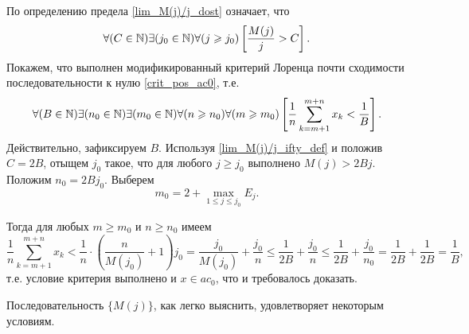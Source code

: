По определению предела \eqref{lim_M(j)/j_dost} означает, что
\begin{equation}\label{lim_M(j)/j_ifty_def}
	\forall(C  \in\N)
	\exists(j_0\in\N)
	\forall(j \geq j_0)
	\left[
		\frac{M(j)}{j}>C
	\right]
	.
\end{equation}
Покажем, что выполнен модификированный критерий Лоренца почти сходимости последовательности к нулю
\eqref{crit_pos_ac0}, т.е.
\begin{equation}
	\forall(B  \in\N)
	\exists(n_0\in\N)
	\exists(m_0\in\N)
	\forall(n\geq n_0)
	\forall(m\geq m_0)
	\\
	\left[
		\frac{1}{n}
		\sum_{k=m+1}^{m+n} x_k
		<
		\frac{1}{B}
	\right]
	.
\end{equation} Действительно, зафиксируем $B$.
Используя \eqref{lim_M(j)/j_ifty_def} и положив $C=2B$,
отыщем $j_0$ такое, что для любого $j\geq j_0$ выполнено
$M(j)>2Bj$.
Положим $n_0 = 2Bj_0$.
Выберем
$$
	m_0 = 2+\max_{1\leq j \leq j_0} E_j
	.
$$

Тогда для любых $m\geq m_0$ и $n\geq n_0$ имеем
\begin{equation}
	\frac{1}{n} \sum_{k=m+1}^{m+n} x_k
	<
	\frac{1}{n} \cdot \left( \frac{n}{M(j_0)} + 1 \right) j_0
	=
	\frac{j_0}{M(j_0)} + \frac{j_0}{n}
	\leq
	\frac{1}{2B} + \frac{j_0}{n}
	\leq
	\frac{1}{2B} + \frac{j_0}{n_0}
	=
	\frac{1}{2B} + \frac{1}{2B}
	=
	\frac{1}{B}
	,
\end{equation}
т.е. условие критерия выполнено
и $x\in ac_0$,
что и требовалось доказать.

Последовательность $\{M(j)\}$, как легко выяснить, удовлетворяет некоторым условиям.
